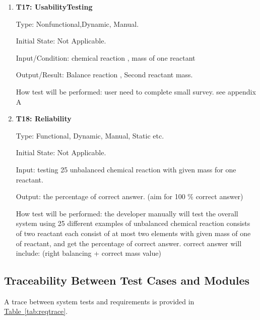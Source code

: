 \documentclass[12pt, titlepage]{article}
\begin{document}
\begin{enumerate}

\item{ \bf T17: UsabilityTesting\\}

Type:  Nonfunctional,Dynamic, Manual.
					
Initial State:  Not Applicable.
					
Input/Condition: chemical reaction ,  mass of one reactant
					
Output/Result: Balance reaction , Second reactant mass.
					
How test will be performed: user need to complete small survey. see appendix A 
					
\item{\bf T18: Reliability\\}

Type: Functional, Dynamic, Manual, Static etc.
					
Initial State:  Not Applicable.
					
Input: testing 25 unbalanced chemical reaction with given mass for one reactant.
					
Output: the percentage of correct answer. (aim for 100 \% correct answer) 
					
How test will be performed: the developer manually will test the overall system using 25 different examples of unbalanced chemical reaction consists of two reactant each consist of at most two elements with given mass of one of reactant, and get the percentage of correct answer. correct answer will include: (right balancing + correct mass value) 

\end{enumerate}
		

\subsection{Traceability Between Test Cases and Modules}

A trace between system tests and requirements is provided in 
\hyperref[tab:reqtrace]{Table~\ref*{tab:reqtrace}}.

\begin{table}[h!]
\centering
{}
\caption{Traceability Matrix Showing the Connections Between Modules and Test Cases}
\label{tab:reqtrace}
\end{table}
\end{document}
